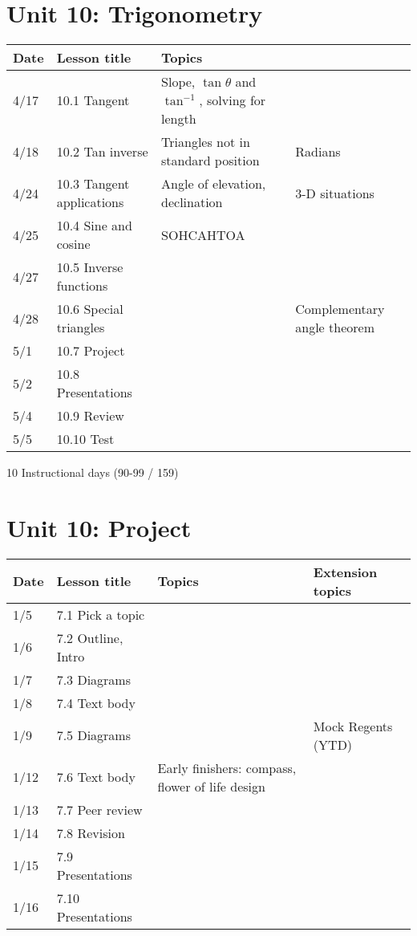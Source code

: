 \documentclass[12pt, twoside]{article}
\begin{document}
\section*{Unit 10: Trigonometry}
\begin{tabular}{|p{0.9cm}|p{4cm}|p{7cm}|p{5cm}|}
  \hline
  Date & Lesson title & Topics  &  \\
  \hline
  4/17 & 10.1 Tangent & Slope, $\tan \theta$ and $\tan^{-1}$, solving for length &  \\
  \hline
  4/18 & 10.2 Tan inverse & Triangles not in standard position & Radians \\
  \hline
  4/24 & 10.3 Tangent applications & Angle of elevation, declination & 3-D situations \\
  \hline
  4/25 & 10.4 Sine and cosine & SOHCAHTOA &  \\
  \hline
  4/27 & 10.5 Inverse functions &  &  \\
  \hline
  4/28 & 10.6 Special triangles &  & Complementary angle theorem \\
  \hline
  5/1 & 10.7 Project &  &  \\
  \hline
  5/2 & 10.8 Presentations &  &  \\
  \hline
  5/4 & 10.9 Review &  &  \\
  \hline
  5/5 & 10.10 Test &  &  \\
  \hline

\end{tabular} \par \vspace*{0.3cm}
10 Instructional days (90-99 / 159)

\section*{Unit 10: Project}
\begin{tabular}{|p{0.9cm}|p{4cm}|p{7cm}|p{5cm}|}
  \hline
  Date & Lesson title & Topics  & Extension topics \\
  \hline
  1/5 & 7.1 Pick a topic &  &  \\
  \hline
  1/6 & 7.2 Outline, Intro &  &  \\
  \hline
  1/7 & 7.3 Diagrams &  &  \\
  \hline
  1/8 & 7.4 Text body &  &  \\
  \hline
  1/9 & 7.5 Diagrams &  & Mock Regents (YTD) \\
  \hline
  1/12 & 7.6 Text body & Early finishers: compass, flower of life design &  \\
  \hline
  1/13 & 7.7 Peer review &  &  \\
  \hline
  1/14 & 7.8 Revision &  & \\
  \hline
  1/15 & 7.9 Presentations &  &  \\
  \hline
  1/16 & 7.10 Presentations &  & \\
  \hline

\end{tabular} \par \vspace*{0.3cm}
\end{document}

